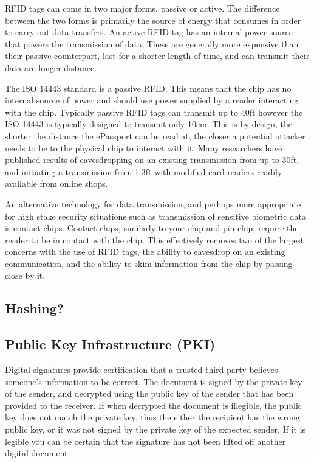 \documentclass[12pt]{article}
\begin{document}
RFID tags can come in two major forms, passive or active. The difference between the two forms is primarily the source of energy that consumes in order to carry out data transfers. An active RFID tag has an internal power source that powers the transmission of data. These are generally more expensive than their passive counterpart, last for a shorter length of time, and can transmit their data are longer distance.

The ISO 14443 standard is a passive RFID. This means that the chip has no internal source of power and should use power supplied by a reader interacting with the chip. Typically passive RFID tags can transmit up to 40ft however the ISO 14443 is typically designed to transmit only 10cm. This is by design, the shorter the distance the ePassport can be read at, the closer a potential attacker needs to be to the physical chip to interact with it. Many researchers have published results of eavesdropping on an existing transmission from up to 30ft, and initiating a transmission from 1.3ft \cite{Kfir:2005tv,Yoshida:2004ta} with modified card readers readily available from online shops.

An alternative technology for data transmission, and perhaps more appropriate for high stake security situations such as transmission of sensitive biometric data is contact chips. Contact chips, similarly to your chip and pin chip, require the reader to be in contact with the chip. This effectively removes two of the largest concerns with the use of RFID tags, the ability to eavesdrop on an existing communication, and the ability to skim information from the chip by passing close by it.

\subsection{Hashing?}
\label{sec:hashing}
{\color{red}{SHA-1/SHA-2 or refer to the other paper for reference to MD5?}}

\subsection{Public Key Infrastructure (PKI)}
\label{sec:PKI}
Digital signatures provide certification that a trusted third party believes someone's information to be correct. The document is signed by the private key of the sender, and decrypted using the public key of the sender that has been provided to the receiver. If when decrypted the document is illegible, the public key does not match the private key, thus the either the recipient has the wrong public key, or it was not signed by the private key of the expected sender. If it is legible you can be certain that the signature has not been lifted off another digital document.
\end{document}
